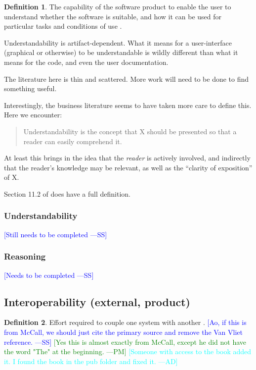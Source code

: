 \documentclass[letterpaper, cleveref]{lipics-v2019}
\newcommand{\authornote}[3]{\textcolor{#1}{[#3 ---#2]}}
\newcommand{\authornote}[3]{}
\newcommand{\wss}[1]{\authornote{blue}{SS}{#1}} %
\newcommand{\pmi}[1]{\authornote{green}{PM}{#1}} %
\newcommand{\ad}[1]{\authornote{cyan}{AD}{#1}} %
\newcommand{\notdone}[1]{\textcolor{red}{#1}}
\theoremstyle{definition}
\newtheorem{defn}{Definition}
\begin{document}
\begin{defn}
  The capability of the software product to enable the user to understand
  whether the software is suitable, and how it can be used for particular tasks
  and conditions of use \cite{ISO9126}. %
\end{defn}

Understandability is artifact-dependent.  What it means for a user-interface
(graphical or otherwise) to be understandable is wildly different than what
it means for the code, and even the user documentation.

The literature here is thin and scattered.  More work will need to be done
to find something useful.

Interestingly, the business literature seems to have taken more care to
define this.  Here we encounter:

\begin{quote}
  Understandability is the concept that X should be presented so that a reader
  can easily comprehend it.
\end{quote}

At least this brings in the idea that the \emph{reader} is actively involved,
and indirectly that the reader's knowledge may be relevant, as well as the
``clarity of exposition'' of X.

Section 11.2 of \citet{adams2015nonfunctional} does have a full definition.

\begin{mybox}
\subsubsection*{Understandability}
\wss{Still needs to be completed}
\end{mybox}

\subsubsection*{Reasoning}

\wss{Needs to be completed}


\subsection{Interoperability (external, product)} %

\begin{defn}
  Effort required to couple one system with another \citep{McCallEtAl1977}.
  \wss{Ao, if this is from McCall, we should just cite the primary source
  and remove the Van Vliet reference.} \pmi{Yes this is almost exactly from
  McCall, except he did not have the word "The" at the beginning.}
  \ad{Someone with access to the book added it. I found the book in the pub
  folder and fixed it.}
\end{defn}
\end{document}
